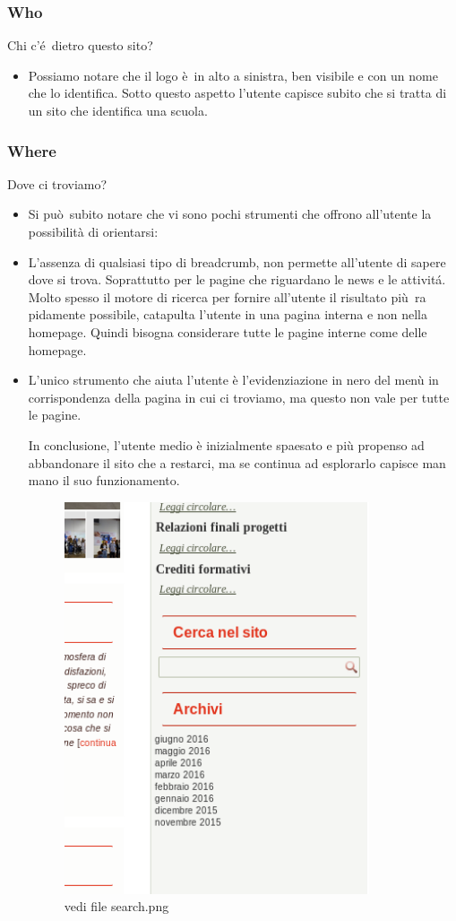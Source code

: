 \documentclass[12pt]{article}
\begin{document}
\subsubsection{Who} Chi c'\'e\ dietro questo sito?
\begin{itemize}
	\item Possiamo notare che il logo \`e\ in alto a sinistra, ben visibile e con un nome che lo identifica. Sotto questo aspetto l'utente capisce subito che si tratta di  un sito che identifica una scuola.
\end{itemize}
\subsubsection{Where} Dove ci troviamo?
\begin{itemize}
	\item Si pu\`o\ subito notare che vi sono pochi strumenti che offrono all'utente la possibilit\`a di orientarsi:

	\item L'assenza di qualsiasi tipo di breadcrumb, non permette all'utente di sapere dove si trova. Soprattutto per le pagine che riguardano le news e le attivit\'a. Molto spesso il motore di ricerca per fornire all'utente il risultato pi\`u\  ra pidamente possibile, catapulta l'utente in una pagina interna e non nella homepage. Quindi bisogna considerare tutte le pagine interne come delle homepage.
	\item L'unico strumento che aiuta l'utente \`e l'evidenziazione in nero del men\`u in corrispondenza della pagina in cui ci troviamo, ma questo non vale per tutte le pagine.

In conclusione, l'utente medio \`e inizialmente spaesato e pi\`u propenso ad abbandonare il sito che a restarci, ma se continua ad esplorarlo capisce man mano il suo funzionamento.

\begin{figure}[ht!]
\centering
\includegraphics[width=90mm]{search}
\caption{vedi file search.png}
\end{figure} 
\end{itemize}
\end{document}
